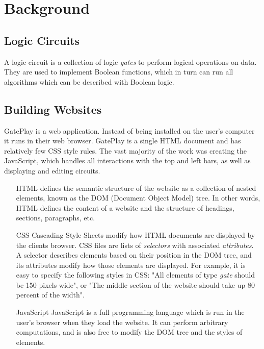 \chapter{Background}
\label{chapter:background}

\section{Logic Circuits}
\label{sec:circuits}
A logic circuit is a collection of logic \textit{gates} to perform logical operations on data. They are used to implement Boolean functions, which in turn can run all algorithms which can be described with Boolean logic.

\section{Building Websites}
GatePlay is a web application. Instead of being installed on the user's computer it runs in their web browser. GatePlay is a single HTML document and has relatively few CSS style rules. The vast majority of the work was creating the JavaScript, which handles all interactions with the top and left bars, as well as displaying and editing circuits.

\begin{itemize}
	\item[HTML] defines the semantic structure of the website as a collection of nested elements, known as the DOM (Document Object Model) tree. In other words, HTML defines the content of a website and the structure of headings, sections, paragraphs, etc.
	
	\item[CSS] Cascading Style Sheets modify how HTML documents are displayed by the clients browser. CSS files are lists of \textit{selectors} with associated \textit{attributes}. A selector describes elements based on their position in the DOM tree, and its attributes modify how those elements are displayed. For example, it is easy to specify the following styles in CSS: "All elements of type \textit{gate} should be 150 pixels wide", or "The middle section of the website should take up 80 percent of the width".
	
	\item[JavaScript] JavaScript is a full programming language which is run in the user's browser when they load the website. It can perform arbitrary computations, and is also free to modify the DOM tree and the styles of elements.
\end{itemize}